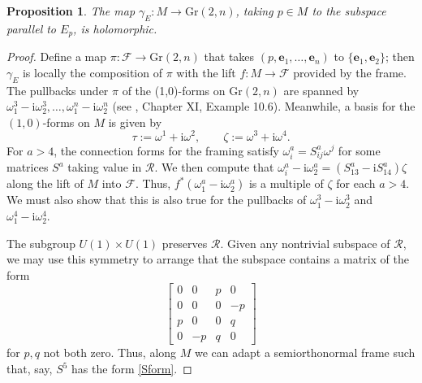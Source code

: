 \documentclass[12pt,reqno]{amsart}
\newtheorem{prop}[theorem]{Proposition}
\theoremstyle{definition}
\theoremstyle{remark}
\begin{document}
\begin{prop}\label{Grassprop} The map $\gamma_E:M \to {{\mathrm{Gr}}}(2,n)$, taking $p\in M$ to the
subspace parallel to $E_p$, is holomorphic.
\end{prop}
\begin{proof}Define a map $\pi:{\mathscr F} \to {{\mathrm{Gr}}}(2,n)$ that takes
$(p,{\mathbf e}_1, \ldots, {\mathbf e}_n)$ to $\{{\mathbf e}_1, {\mathbf e}_2\}$; then
$\gamma_E$ is locally the composition of $\pi$ with the lift $f:M \to {\mathscr F}$
provided by the frame.
The pullbacks under $\pi$ of the (1,0)-forms on ${{\mathrm{Gr}}}(2,n)$ are spanned by
${\omega}^3_1 -{\mathrm i} {\omega}^3_2, \ldots, {\omega}^n_1 -{\mathrm i} {\omega}^n_2$
(see \cite{KN}, Chapter XI, Example 10.6).  Meanwhile, a basis for the $(1,0)$-forms
on $M$ is given by
\begin{equation}\label{firsttauzeta}
\tau := {\omega}^1 + {\mathrm i} {\omega}^2,\qquad \zeta := {\omega}^3+ {\mathrm i} {\omega}^4.
\end{equation}
For $a>4$, the connection forms for the framing satisfy ${\omega}^a_i = S^a_{ij} {\omega}^j$
for some matrices $S^a$ taking value in ${\mathcal R}$.  We then compute that
${\omega}^a_i - {\mathrm i} {\omega}^a_2 = (S^a_{13}-{\mathrm i} S^a_{14})\zeta$
along the lift of $M$ into ${\mathscr F}$.  Thus, $f^*({\omega}^a_1 - {\mathrm i} {\omega}^a_2)$ is a multiple of
$\zeta$ for each $a>4$.  We must also show that
this is also true for the pullbacks of ${\omega}^3_1 -{\mathrm i} {\omega}^3_2$ and ${\omega}^4_1 -{\mathrm i}{\omega}^4_2$.

The subgroup $U(1) \times U(1)$ preserves ${\mathcal R}$.  Given any nontrivial
subspace of ${\mathcal R}$, we may use this symmetry to arrange that
the subspace contains a matrix of the form
\begin{equation}\label{Sform}
\begin{bmatrix} 0 & 0 & p & 0 \\ 0 & 0 & 0 & -p \\ p & 0 & 0 & q \\ 0 & -p & q & 0\end{bmatrix}
\end{equation}
for $p,q$ not both zero.  Thus, along $M$ we can adapt a semiorthonormal frame
such that, say, $S^5$ has the form \eqref{Sform}.


\end{proof}
\end{document}
